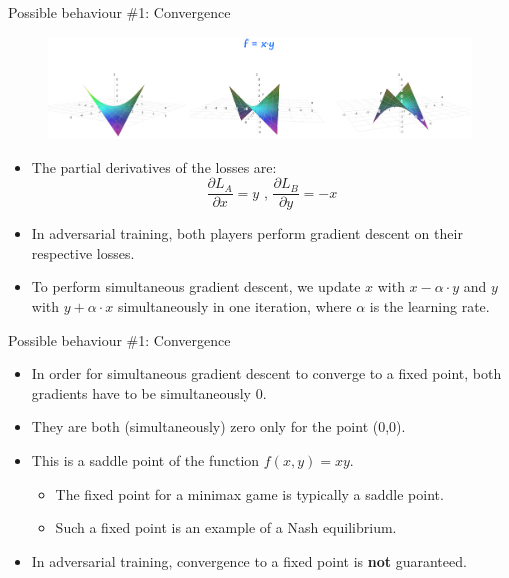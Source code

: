     
\begin{frame} {Possible behaviour \#1: Convergence}
  \begin{figure}
    \centering
     {\includegraphics{plots/adv_xy.png}}
  \end{figure}
  \begin{itemize}
    \item The partial derivatives of the losses are:
     \begin{equation*}
       \frac {\partial{L_{A}}}{\partial x} = y \text{ , }
       \frac {\partial{L_{B}}}{\partial y} = -x
     \end{equation*}
    \item In adversarial training, both players perform gradient descent on their respective losses.
    \item To perform simultaneous gradient descent, we update $x$ with $x - \alpha \cdot y$ and $y$ with $y + \alpha \cdot x$ simultaneously in one iteration, where $\alpha$ is the learning rate.
  \end{itemize}
\end{frame}

\begin{frame} {Possible behaviour \#1: Convergence}
  \begin{figure}
    \centering
  \end{figure}
  \begin{itemize}
    \item In order for simultaneous gradient descent to converge to a fixed point, both gradients have to be simultaneously 0.
    \item They are both (simultaneously) zero only for the point (0,0).
    \item This is a saddle point of the function $f(x,y) = xy$.
    \begin{itemize}
       \item The fixed point for a minimax game is typically a saddle point.
      \item Such a fixed point is an example of a Nash equilibrium.
    \end{itemize}
    \item In adversarial training, convergence to a fixed point is \textbf{not} guaranteed.
  \end{itemize}
\end{frame}

